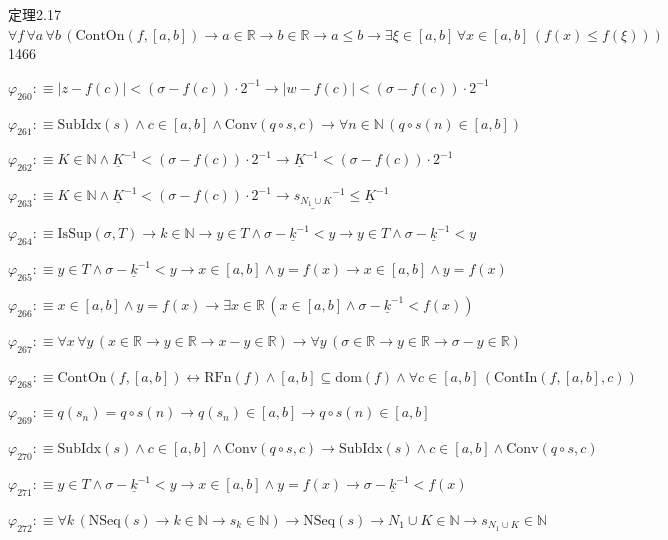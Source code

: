\begin{fullproof}{定理2.17}{$\forall f\,\forall a\,\forall b\,(\mathrm{ContOn}(f,[a,b]) \to a \in \mathbb{R} \to b \in \mathbb{R} \to a \leq b \to \exists \xi \in [a,b]\,\forall x \in [a,b]\,(f(x) \leq f(\xi)))$}{1466}
\begin{abbrevlist}
\item $\varphi_{260} :\equiv \lvert z - f(c) \rvert < (\sigma - f(c)) \cdot 2^{-1} \to \lvert w - f(c) \rvert < (\sigma - f(c)) \cdot 2^{-1}$
\item $\varphi_{261} :\equiv \mathrm{SubIdx}(s) \land c \in [a,b] \land \mathrm{Conv}(q \circ s,c) \to \forall n \in \mathbb{N}\,(q \circ s(n) \in [a,b])$
\item $\varphi_{262} :\equiv K \in \mathbb{N} \land \underline{K}^{-1} < (\sigma - f(c)) \cdot 2^{-1} \to \underline{K}^{-1} < (\sigma - f(c)) \cdot 2^{-1}$
\item $\varphi_{263} :\equiv K \in \mathbb{N} \land \underline{K}^{-1} < (\sigma - f(c)) \cdot 2^{-1} \to \underline{s_{N_{1} \cup K}}^{-1} \leq \underline{K}^{-1}$
\item $\varphi_{264} :\equiv \mathrm{IsSup}(\sigma,T) \to k \in \mathbb{N} \to y \in T \land \sigma - \underline{k}^{-1} < y \to y \in T \land \sigma - \underline{k}^{-1} < y$
\item $\varphi_{265} :\equiv y \in T \land \sigma - \underline{k}^{-1} < y \to x \in [a,b] \land y = f(x) \to x \in [a,b] \land y = f(x)$
\item $\varphi_{266} :\equiv x \in [a,b] \land y = f(x) \to \exists x \in \mathbb{R}\,(x \in [a,b] \land \sigma - \underline{k}^{-1} < f(x))$
\item $\varphi_{267} :\equiv \forall x\,\forall y\,(x \in \mathbb{R} \to y \in \mathbb{R} \to x - y \in \mathbb{R}) \to \forall y\,(\sigma \in \mathbb{R} \to y \in \mathbb{R} \to \sigma - y \in \mathbb{R})$
\item $\varphi_{268} :\equiv \mathrm{ContOn}(f,[a,b]) \leftrightarrow \mathrm{RFn}(f) \land [a,b] \subseteq \mathrm{dom}(f) \land \forall c \in [a,b]\,(\mathrm{ContIn}(f,[a,b],c))$
\item $\varphi_{269} :\equiv q(s_{n}) = q \circ s(n) \to q(s_{n}) \in [a,b] \to q \circ s(n) \in [a,b]$
\item $\varphi_{270} :\equiv \mathrm{SubIdx}(s) \land c \in [a,b] \land \mathrm{Conv}(q \circ s,c) \to \mathrm{SubIdx}(s) \land c \in [a,b] \land \mathrm{Conv}(q \circ s,c)$
\item $\varphi_{271} :\equiv y \in T \land \sigma - \underline{k}^{-1} < y \to x \in [a,b] \land y = f(x) \to \sigma - \underline{k}^{-1} < f(x)$
\item $\varphi_{272} :\equiv \forall k\,(\mathrm{NSeq}(s) \to k \in \mathbb{N} \to s_{k} \in \mathbb{N}) \to \mathrm{NSeq}(s) \to N_{1} \cup K \in \mathbb{N} \to s_{N_{1} \cup K} \in \mathbb{N}$

\end{abbrevlist}
\end{fullproof}
